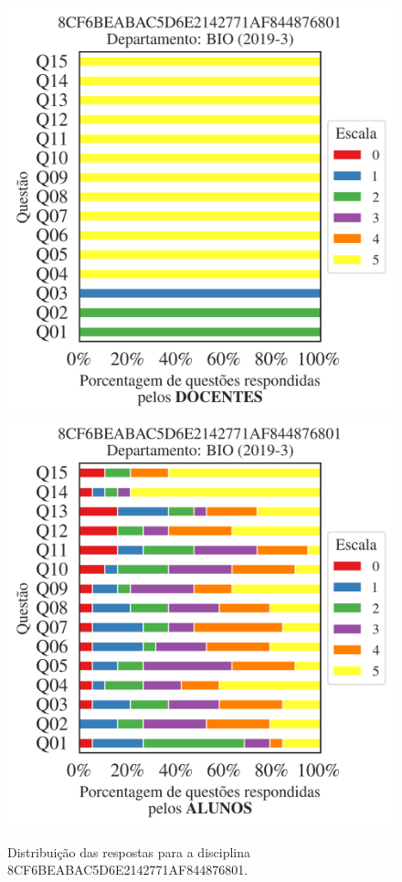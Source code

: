 \documentclass[a4paper,10pt]{article}
\begin{document}
\begin{figure}[h]
\centering
\includegraphics[width=0.485\linewidth]{analise_disciplina_departamento_BIO_8CF6BEABAC5D6E2142771AF844876801_docentes.png}
\includegraphics[width=0.485\linewidth]{analise_disciplina_departamento_BIO_8CF6BEABAC5D6E2142771AF844876801_alunos.png}
\caption{\label{fig:analise_geral_departamento}                Distribuição das respostas para a disciplina 8CF6BEABAC5D6E2142771AF844876801. }
\end{figure}
\end{document}
